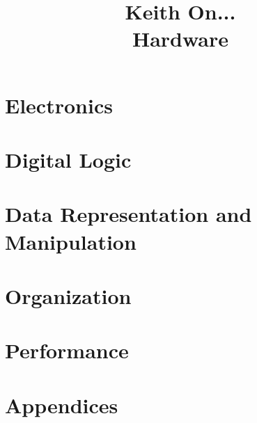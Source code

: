 \documentclass[]{book}
\title{
{\Large Keith On...} \\
{\huge Hardware}
}
\author{
  
}
\date{}
\begin{document}
\normalbaselineskip

\maketitle

\tableofcontents



\part{Electronics}







\part{Digital Logic}







\part{Data Representation and Manipulation}



\part{Organization}









\part{Performance}






\part{Appendices}
\appendix












\end{document}
